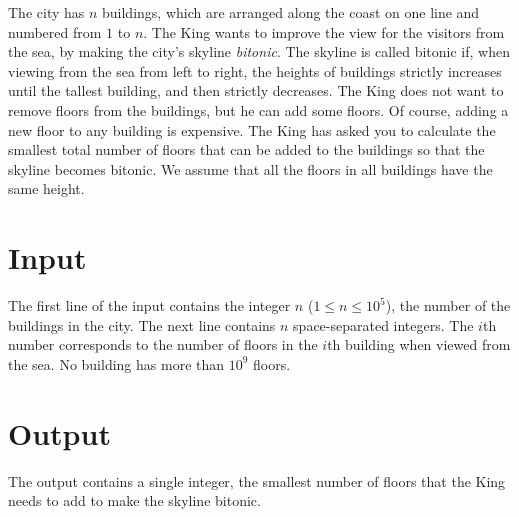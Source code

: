 
The city has $n$ buildings, which are arranged along the coast on one line and numbered from $1$ to $n$.
The King wants to improve the view for the visitors from the sea, by making the city’s skyline \emph{bitonic}.
The skyline is called bitonic if, when viewing from the sea from left to right, the heights of buildings strictly increases until the tallest building, and then strictly decreases.
The King does not want to remove floors from the buildings, but he can add some floors.
Of course, adding a new floor to any building is expensive.
The King has asked you to calculate the smallest total number of floors that can be added to the buildings so that the skyline becomes bitonic.
We assume that all the floors in all buildings have the same height.

\section*{Input}
The first line of the input contains the integer $n$ ($1 \leq n \leq 10^5$), the number of the buildings in the city.
The next line contains $n$ space-separated integers.
The $i$th number corresponds to the number of floors in the $i$th building when viewed from the sea.
No building has more than $10^9$ floors. 

\section*{Output}
The output contains a single integer, the smallest number of floors that the King needs to add to make the skyline bitonic.